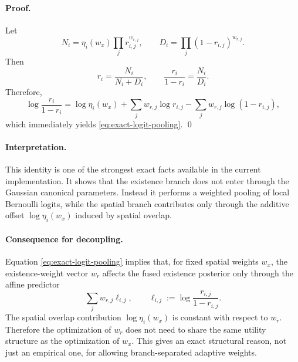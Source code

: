 \paragraph{Proof.}
Let
\begin{equation}
N_i = \eta_i(w_x)\prod_j r_{i,j}^{w_{r,j}},
\qquad
D_i = \prod_j (1-r_{i,j})^{w_{r,j}}.
\end{equation}
Then
\begin{equation}
r_i = \frac{N_i}{N_i + D_i},
\qquad
\frac{r_i}{1-r_i} = \frac{N_i}{D_i}.
\end{equation}
Therefore,
\begin{equation}
\log \frac{r_i}{1-r_i}
=
\log \eta_i(w_x)
+
\sum_j w_{r,j}\log r_{i,j}
-
\sum_j w_{r,j}\log(1-r_{i,j}),
\end{equation}
which immediately yields \eqref{eq:exact-logit-pooling}. \qed

\paragraph{Interpretation.}
This identity is one of the strongest exact facts available in the current implementation. It shows that the existence branch does not enter through the Gaussian canonical parameters. Instead it performs a weighted pooling of local Bernoulli logits, while the spatial branch contributes only through the additive offset $\log \eta_i(w_x)$ induced by spatial overlap.

\paragraph{Consequence for decoupling.}
Equation \eqref{eq:exact-logit-pooling} implies that, for fixed spatial weights $w_x$, the existence-weight vector $w_r$ affects the fused existence posterior only through the affine predictor
\begin{equation}
\sum_j w_{r,j}\ell_{i,j},
\qquad
\ell_{i,j} := \log \frac{r_{i,j}}{1-r_{i,j}}.
\end{equation}
The spatial overlap contribution $\log \eta_i(w_x)$ is constant with respect to $w_r$. Therefore the optimization of $w_r$ does not need to share the same utility structure as the optimization of $w_x$. This gives an exact structural reason, not just an empirical one, for allowing branch-separated adaptive weights.

